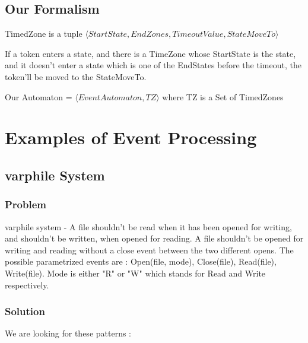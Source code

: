 				
				
		\subsection{Our Formalism}
			TimedZone is a tuple $\langle StartState, EndZones, TimeoutValue, StateMoveTo  \rangle$
			
			If a token enters a state, and there is a TimeZone whose StartState is the state, and it doesn't enter a state which is one of the EndStates before the timeout, the token'll be moved to the StateMoveTo.
			
			Our Automaton = $\langle EventAutomaton, TZ \rangle$ where TZ is a Set of TimedZones
	\section{Examples of Event Processing}
 
		\subsection{varphile System}
			\subsubsection{Problem}
				varphile system - A file shouldn't be read when it has been opened for writing, and shouldn't be written, when opened for reading. 
				A file shouldn't be opened for writing and reading without a close event between the two different opens.
				The possible parametrized events are : Open(file, mode), Close(file), Read(file), Write(file). Mode is either "R" or "W" which stands for Read and Write respectively.
			\subsubsection{Solution}
				We are looking for these patterns : 
				
